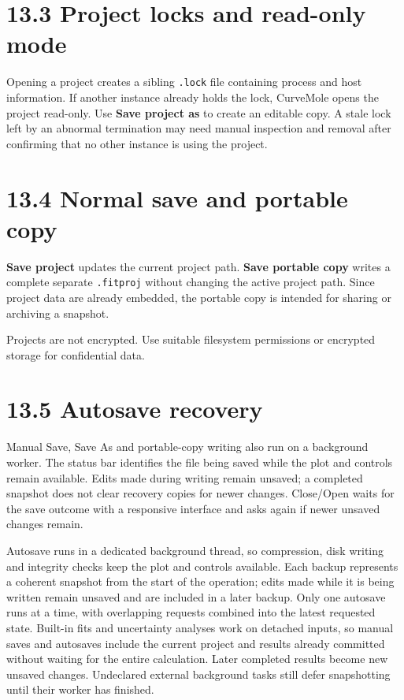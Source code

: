 \documentclass[
  10pt,
  a4paper,
  oneside]{scrreprt}
\begin{document}
\hypertarget{project-locks-and-read-only-mode}{%
\section{13.3 Project locks and read-only
mode}\label{project-locks-and-read-only-mode}}

Opening a project creates a sibling \texttt{.lock} file containing
process and host information. If another instance already holds the
lock, CurveMole opens the project read-only. Use \textbf{Save project
as} to create an editable copy. A stale lock left by an abnormal
termination may need manual inspection and removal after confirming that
no other instance is using the project.

\hypertarget{normal-save-and-portable-copy}{%
\section{13.4 Normal save and portable
copy}\label{normal-save-and-portable-copy}}

\textbf{Save project} updates the current project path. \textbf{Save
portable copy} writes a complete separate \texttt{.fitproj} without
changing the active project path. Since project data are already
embedded, the portable copy is intended for sharing or archiving a
snapshot.

Projects are not encrypted. Use suitable filesystem permissions or
encrypted storage for confidential data.

\hypertarget{autosave-recovery}{%
\section{13.5 Autosave recovery}\label{autosave-recovery}}

Manual Save, Save As and portable-copy writing also run on a background
worker. The status bar identifies the file being saved while the plot
and controls remain available. Edits made during writing remain unsaved;
a completed snapshot does not clear recovery copies for newer changes.
Close/Open waits for the save outcome with a responsive interface and
asks again if newer unsaved changes remain.

Autosave runs in a dedicated background thread, so compression, disk
writing and integrity checks keep the plot and controls available. Each
backup represents a coherent snapshot from the start of the operation;
edits made while it is being written remain unsaved and are included in
a later backup. Only one autosave runs at a time, with overlapping
requests combined into the latest requested state. Built-in fits and
uncertainty analyses work on detached inputs, so manual saves and
autosaves include the current project and results already committed
without waiting for the entire calculation. Later completed results
become new unsaved changes. Undeclared external background tasks still
defer snapshotting until their worker has finished.
\end{document}
